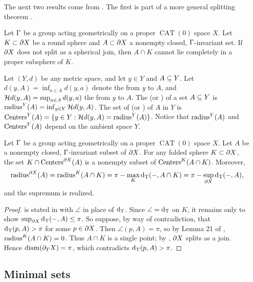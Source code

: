 \documentclass{amsart}
\newcommand{\bdT}{\partial_T}
\DeclareMathOperator{\CAT}{CAT}
\begin{document}
The next two results come from \cite{ricks-radius}.
The first is part of a more general splitting theorem \cite[Theorem C]{ricks-radius}.

\begin{theorem}			\label{radius rigidity}
Let $\Gamma$ be a group acting geometrically on a proper $\CAT(0)$ space $X$.
Let $K \subset \partial X$ be a round sphere and $A \subset \partial X$ a nonempty closed, $\Gamma$-invariant set.  If $\partial X$ does not split as a spherical join, then $A \cap K$ cannot lie completely in a proper subsphere of $K$. \end{theorem}

Let $(Y,d)$ be any metric space, and let $y \in Y$ and $A \subseteq Y$.
Let $d(y, A) = \inf_{a \in A} d(y, a)$ denote the  from $y$ to $A$, and $\mathcal{H}d(y, A) = \sup_{a \in A} d(y, a)$ the  from $y$ to $A$.
The  (or ) of a set $A \subseteq Y$ is $\operatorname{radius}^Y (A) = \inf_{y \in Y} \mathcal{H}d(y, A)$.
The set of  (or ) of $A$ in $Y$ is $\operatorname{Centers}^Y (A) = \{y \in Y : \mathcal{H}d(y, A) = \operatorname{radius}^Y (A)\}$.
Notice that $\operatorname{radius}^Y (A)$ and $\operatorname{Centers}^Y (A)$ depend on the ambient space $Y$.

\begin{lemma} 	\label{centers lemma}
Let $\Gamma$ be a group acting geometrically on a proper $\CAT(0)$ space $X$.
Let $A$ be a nonempty closed, $\Gamma$-invariant subset of $\partial X$.  For any folded sphere $K \subset \partial X$, the set $K \cap \operatorname{Centers}^{\partial X} (A)$ is a nonempty subset of $\operatorname{Centers}^{K} (A \cap K)$.  Moreover,
\[\operatorname{radius}^{\partial X} (A) = \operatorname{radius}^{K} (A \cap K) = \pi - \max_{K} \operatorname{d_T}(-, A \cap K) = \pi - \sup_{\partial X} \operatorname{d_T}(-, A),
\]
and the supremum is realized. \end{lemma}

\begin{proof}
 is stated in \cite[Lemma 21]{ricks-radius} with $\angle$ in place of $\operatorname{d_T}$.
Since $\angle = \operatorname{d_T}$ on $K$, it remains only to show $\sup_{\partial X} \operatorname{d_T}(-, A) \le \pi$.
So suppose, by way of contradiction, that $\operatorname{d_T}(p, A) > \pi$ for some $p \in \partial X$.
Then $\angle (p, A) = \pi$, so by Lemma 21 of \cite{ricks-radius}, $\operatorname{radius}^{K} (A \cap K) = 0$.
Thus $A \cap K$ is a single point;
by , $\partial X$ splits as a join.
Hence $\diam (\bdT X) = \pi$, which contradicts $\operatorname{d_T}(p, A) > \pi$.
\end{proof}

\subsection{Minimal sets}
\end{document}
